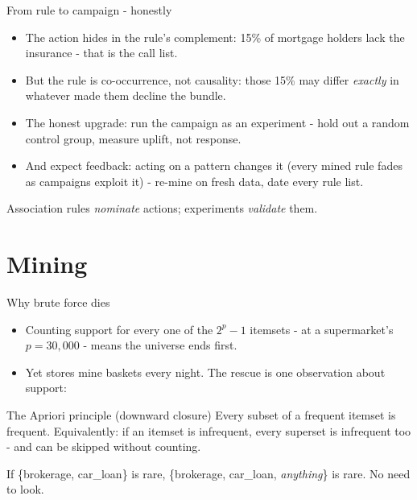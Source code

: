 \documentclass[10pt,aspectratio=169]{beamer}
\begin{document}
\begin{frame}{From rule to campaign - honestly}
  \begin{itemize}
    \item The action hides in the rule's \alert{complement}: 15\% of
          mortgage holders lack the insurance - that is the call list.
    \item But the rule is co-occurrence, not causality: those 15\% may
          differ \emph{exactly} in whatever made them decline the bundle.
    \item The honest upgrade: run the campaign as an \alert{experiment} -
          hold out a random control group, measure uplift, not response.
    \item And expect \alert{feedback}: acting on a pattern changes it
          (every mined rule fades as campaigns exploit it) -
          re-mine on fresh data, date every rule list.
  \end{itemize}
  \vspace{0.4em}
  \begin{center}\small
    Association rules \emph{nominate} actions; experiments
    \emph{validate} them.
  \end{center}
\end{frame}

\section{Mining}

\begin{frame}{Why brute force dies}
  \begin{itemize}
    \item Counting support for every one of the $2^p - 1$ itemsets - at
          a supermarket's $p = 30{,}000$ - means the universe ends
          first.
    \item Yet stores mine baskets every night. The rescue is one
          observation about support:
  \end{itemize}
  \vspace{0.6em}
  \begin{block}{The Apriori principle (downward closure)}
    Every subset of a frequent itemset is frequent. Equivalently: if an
    itemset is infrequent, \alert{every superset is infrequent too} -
    and can be skipped without counting.
  \end{block}
  \vspace{0.4em}
  \begin{center}\small
    If \{brokerage, car\_loan\} is rare, \{brokerage, car\_loan,
    \emph{anything}\} is rare. No need to look.
  \end{center}
\end{frame}
\end{document}
